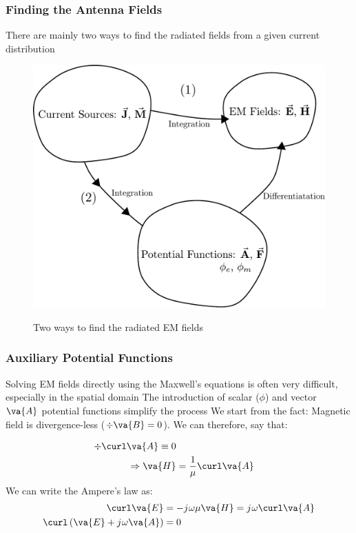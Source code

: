 \documentclass[10pt, compress]{beamer}
\renewcommand{\O}{\omega}  %
\renewcommand{\u}{\mu}  %
\renewcommand{\j}{{j}\mkern1mu} %
\begin{document}
\begin{frame}[fragile]
  \frametitle{Finding the Antenna Fields}
  \begin{outline}
    \1 There are mainly two ways to find the radiated fields from a given current distribution
  \end{outline}
  \begin{figure}
    \centering
    {\includegraphics[width=.6\linewidth]{calculation.pdf}
      \label{fig:aug_fields}}
    \caption{Two ways to find the radiated EM fields}
  \end{figure}
\end{frame}


\begin{frame}
  \frametitle{Auxiliary Potential Functions}
  \begin{outline}
    \1 Solving EM fields directly using the Maxwell's equations is often very difficult, especially in the spatial domain
    \1 The introduction of scalar (${\phi}$) and vector $\va{A}$ potential functions simplify the process
    \1 We start from the fact:
    \2 Magnetic field is divergence-less ($\div \va{B} = 0$). We can therefore, say that:
  \end{outline}
  \begin{align*}
    \div \curl \va{A} \equiv 0                       \\
    \Rightarrow \va{H} & = \frac{1}{\u} \curl \va{A}
  \end{align*}
  We can write the Ampere's law as:
  \begin{align*}
    \curl \va{E}                               & = - \j \O \u \va{H} = \j \O \curl \va{A} \\
    \curl \left (\va{E} + \j \O \va{A} \right) & = 0
  \end{align*}
\end{frame}
\end{document}
